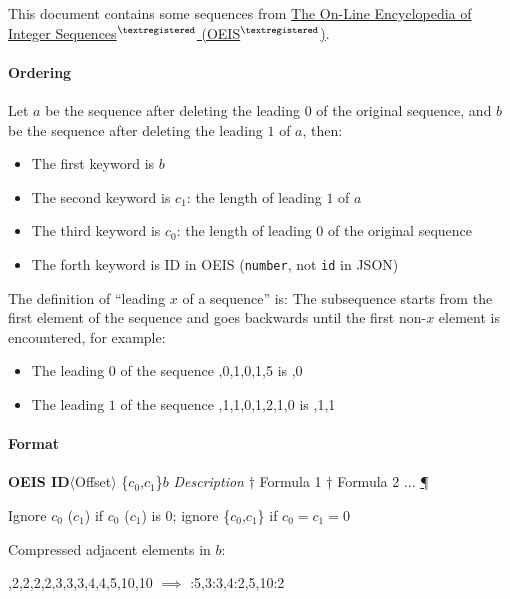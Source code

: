 \documentclass{oeiscommon}
\begin{document}
\thispagestyle{empty}

This document contains some sequences from \href{\oeis}{The On-Line Encyclopedia of Integer Sequences{\(^{\textregistered}\)} (OEIS{\(^{\textregistered}\)})}.

\paragraph{Ordering} Let \(a\) be the sequence after deleting the leading \(0\) of the original sequence, and \(b\) be the sequence after deleting the leading \(1\) of \(a\), then:

\begin{itemize}
    \item The first keyword is \(b\)
    \item The second keyword is \(c_1\): the length of leading \(1\) of \(a\)
    \item The third keyword is \(c_0\): the length of leading \(0\) of the original sequence
    \item The forth keyword is ID in OEIS (\verb|number|, not \verb|id| in JSON)
\end{itemize}

The definition of ``leading \(x\) of a sequence'' is: The subsequence starts from the first element of the sequence and goes backwards until the first non-\(x\) element is encountered, for example:

\begin{itemize}
    \item The leading \(0\) of the sequence {,0,1,0,1,5} is {,0}
    \item The leading \(1\) of the sequence {,1,1,0,1,2,1,0} is {,1,1}
\end{itemize}

\paragraph{Format} \textbf{OEIS ID}\(\langle\)Offset\(\rangle\) \{\(c_0\),\(c_1\)\}\(b\) \textit{Description} \(\dagger\) Formula 1  \(\dagger\) Formula 2 ... \href{\oeis}{\P}

Ignore \(c_0\) (\(c_1\)) if \(c_0\) (\(c_1\)) is \(0\); ignore \{\(c_0\),\(c_1\)\} if \(c_0=c_1=0\)

Compressed adjacent elements in \(b\):

{,2,2,2,2,3,3,3,4,4,5,10,10} \(\implies\) {:5,3:3,4:2,5,10:2}
\end{document}
